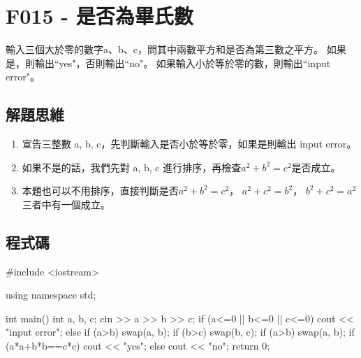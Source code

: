 \section{F015 - 是否為畢氏數}
輸入三個大於零的數字a、b、c，問其中兩數平方和是否為第三數之平方。 如果是，則輸出``yes"，否則輸出``no"。 如果輸入小於等於零的數，則輸出``input error"。
\subsection{解題思維}
\begin{enumerate}
\item 宣告三整數 a, b, c，先判斷輸入是否小於等於零，如果是則輸出 input error。
\item 如果不是的話，我們先對 a, b, c 進行排序，再檢查$a^2+b^2=c^2$是否成立。
\item 本題也可以不用排序，直接判斷是否$a^2+b^2=c^2$， $a^2+c^2=b^2$， $b^2+c^2=a^2$三者中有一個成立。
\end{enumerate}
\subsection{程式碼}
\begin{cppcode}
	#include <iostream>
	
	using namespace std;
	
	int main()
	{
		int a, b, c;
		cin >> a >> b >> c;
		if (a<=0 || b<=0 || c<=0) cout << "input error";
		else {
			if (a>b) swap(a, b);
			if (b>c) swap(b, c);
			if (a>b) swap(a, b);
			if (a*a+b*b==c*c) cout << "yes";
			else cout << "no";
		}
		return 0;
	}
\end{cppcode}
